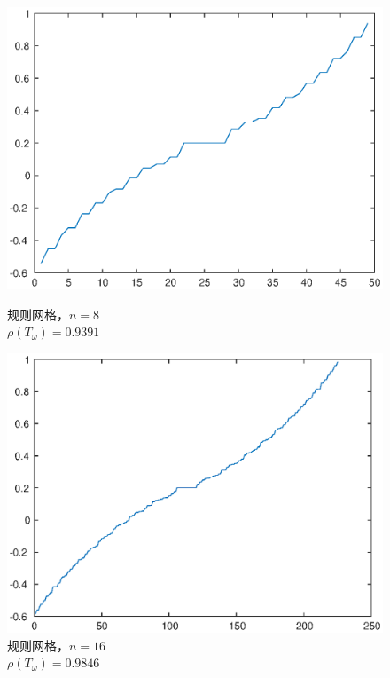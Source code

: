\documentclass[lang=cn,10pt]{elegantbook}
\begin{document}
\begin{figure}[H]
  \centering
  \begin{minipage}[t]{0.28\linewidth}
      \centering
      \includegraphics[width=0.9\linewidth]{figure/3-t-4.eps}
      \caption*{\small 规则网格，$n=8$ \\ $\rho(T_\omega)=0.9391$}
  \end{minipage}
  \hspace{1em}
  \begin{minipage}[t]{0.28\linewidth}
    \centering
    \includegraphics[width=0.9\linewidth]{figure/3-t-5.eps}
    \caption*{\small 规则网格，$n=16$ \\ $\rho(T_\omega)=0.9846$}
  \end{minipage}
  \hspace{1em}
  \begin{minipage}[t]{0.28\linewidth}
    \centering

\end{minipage}
\end{figure}
\end{document}
